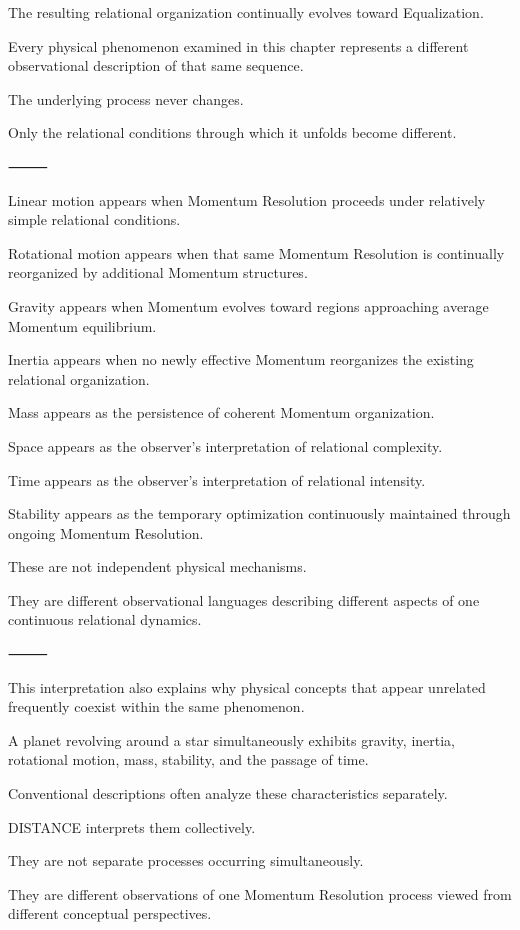 The resulting relational organization continually evolves toward Equalization.

Every physical phenomenon examined in this chapter represents a different observational description of that same sequence.

The underlying process never changes.

Only the relational conditions through which it unfolds become different.

⸻

Linear motion appears when Momentum Resolution proceeds under relatively simple relational conditions.

Rotational motion appears when that same Momentum Resolution is continually reorganized by additional Momentum structures.

Gravity appears when Momentum evolves toward regions approaching average Momentum equilibrium.

Inertia appears when no newly effective Momentum reorganizes the existing relational organization.

Mass appears as the persistence of coherent Momentum organization.

Space appears as the observer’s interpretation of relational complexity.

Time appears as the observer’s interpretation of relational intensity.

Stability appears as the temporary optimization continuously maintained through ongoing Momentum Resolution.

These are not independent physical mechanisms.

They are different observational languages describing different aspects of one continuous relational dynamics.

⸻

This interpretation also explains why physical concepts that appear unrelated frequently coexist within the same phenomenon.

A planet revolving around a star simultaneously exhibits gravity, inertia, rotational motion, mass, stability, and the passage of time.

Conventional descriptions often analyze these characteristics separately.

DISTANCE interprets them collectively.

They are not separate processes occurring simultaneously.

They are different observations of one Momentum Resolution process viewed from different conceptual perspectives.

